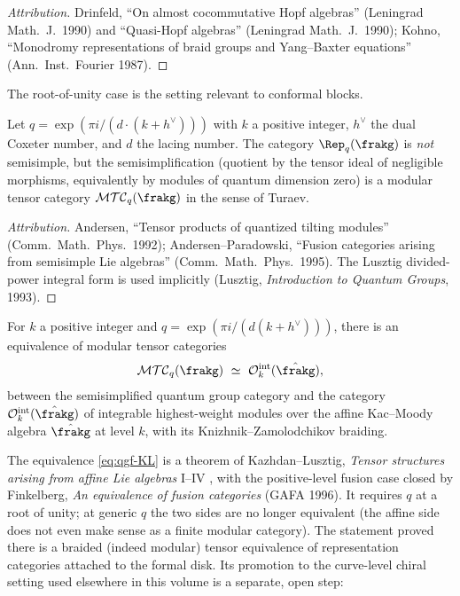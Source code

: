 \begin{proof}[Attribution]
Drinfeld, ``On almost cocommutative Hopf algebras'' (Leningrad Math.\ J.\ 1990) and ``Quasi-Hopf algebras'' (Leningrad Math.\ J.\ 1990); Kohno, ``Monodromy representations of braid groups and Yang--Baxter equations'' (Ann.\ Inst.\ Fourier 1987).
\end{proof}

The root-of-unity case is the setting relevant to conformal blocks.

\begin{proposition}
\label{prop:qgf-mtc-root-of-unity}
Let $q = \exp(\pi i / (d \cdot (k + h^\vee)))$ with $k$ a positive integer, $h^\vee$ the dual Coxeter number, and $d$ the lacing number. The category $\Rep_q(\frakg)$ is \emph{not} semisimple, but the semisimplification (quotient by the tensor ideal of negligible morphisms, equivalently by modules of quantum dimension zero) is a modular tensor category $\mathcal{MTC}_q(\frakg)$ in the sense of Turaev.
\end{proposition}

\begin{proof}[Attribution]
Andersen, ``Tensor products of quantized tilting modules'' (Comm.\ Math.\ Phys.\ 1992); Andersen--Paradowski, ``Fusion categories arising from semisimple Lie algebras'' (Comm.\ Math.\ Phys.\ 1995). The Lusztig divided-power integral form is used implicitly (Lusztig, \emph{Introduction to Quantum Groups}, 1993).
\end{proof}

\begin{theorem}
\label{thm:qgf-kazhdan-lusztig}
For $k$ a positive integer and $q = \exp(\pi i / (d(k + h^\vee)))$, there is an equivalence of modular tensor categories
\begin{equation}
 \mathcal{MTC}_q(\frakg) \ \simeq \ \mathcal{O}_k^{\mathrm{int}}(\hat{\frakg}),
 \label{eq:qgf-KL}
\end{equation}
between the semisimplified quantum group category and the category $\mathcal{O}_k^{\mathrm{int}}(\hat{\frakg})$ of integrable highest-weight modules over the affine Kac--Moody algebra $\hat{\frakg}$ at level $k$, with its Knizhnik--Zamolodchikov braiding.
\end{theorem}

The equivalence \eqref{eq:qgf-KL} is a theorem of Kazhdan--Lusztig, \emph{Tensor structures arising from affine Lie algebras} I--IV \cite{KazhdanLusztig1993,KazhdanLusztig1994}, with the positive-level fusion case closed by Finkelberg, \emph{An equivalence of fusion categories} (GAFA 1996). It requires $q$ at a root of unity; at generic $q$ the two sides are no longer equivalent (the affine side does not even make sense as a finite modular category). The statement proved there is a braided (indeed modular) tensor equivalence of representation categories attached to the formal disk. Its promotion to the curve-level chiral setting used elsewhere in this volume is a separate, open step:

